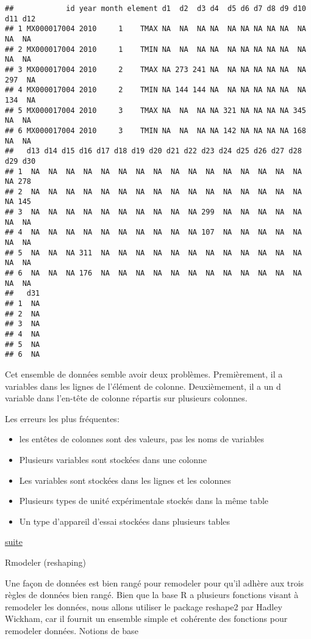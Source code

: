\documentclass[]{article}
\begin{document}
\begin{verbatim}
##            id year month element d1  d2  d3 d4  d5 d6 d7 d8 d9 d10 d11 d12
## 1 MX000017004 2010     1    TMAX NA  NA  NA NA  NA NA NA NA NA  NA  NA  NA
## 2 MX000017004 2010     1    TMIN NA  NA  NA NA  NA NA NA NA NA  NA  NA  NA
## 3 MX000017004 2010     2    TMAX NA 273 241 NA  NA NA NA NA NA  NA 297  NA
## 4 MX000017004 2010     2    TMIN NA 144 144 NA  NA NA NA NA NA  NA 134  NA
## 5 MX000017004 2010     3    TMAX NA  NA  NA NA 321 NA NA NA NA 345  NA  NA
## 6 MX000017004 2010     3    TMIN NA  NA  NA NA 142 NA NA NA NA 168  NA  NA
##   d13 d14 d15 d16 d17 d18 d19 d20 d21 d22 d23 d24 d25 d26 d27 d28 d29 d30
## 1  NA  NA  NA  NA  NA  NA  NA  NA  NA  NA  NA  NA  NA  NA  NA  NA  NA 278
## 2  NA  NA  NA  NA  NA  NA  NA  NA  NA  NA  NA  NA  NA  NA  NA  NA  NA 145
## 3  NA  NA  NA  NA  NA  NA  NA  NA  NA  NA 299  NA  NA  NA  NA  NA  NA  NA
## 4  NA  NA  NA  NA  NA  NA  NA  NA  NA  NA 107  NA  NA  NA  NA  NA  NA  NA
## 5  NA  NA  NA 311  NA  NA  NA  NA  NA  NA  NA  NA  NA  NA  NA  NA  NA  NA
## 6  NA  NA  NA 176  NA  NA  NA  NA  NA  NA  NA  NA  NA  NA  NA  NA  NA  NA
##   d31
## 1  NA
## 2  NA
## 3  NA
## 4  NA
## 5  NA
## 6  NA
\end{verbatim}

Cet ensemble de données semble avoir deux problèmes. Premièrement, il a
variables dans les lignes de l'élément de colonne. Deuxièmement, il a un
d variable dans l'en-tête de colonne répartis sur plusieurs colonnes.

Les erreurs les plus fréquentes:

\begin{itemize}
\itemsep1pt\parskip0pt
\item
  les entêtes de colonnes sont des valeurs, pas les noms de variables
\item
  Plusieurs variables sont stockées dans une colonne
\item
  Les variables sont stockées dans les lignes et les colonnes
\item
  Plusieurs types de unité expérimentale stockés dans la même table
\item
  Un type d'appareil d'essai stockées dans plusieurs tables
\end{itemize}

\href{https://ramnathv.github.io/pycon2014-r/explore/reshape.html}{suite}

Rmodeler (reshaping)

Une façon de données est bien rangé pour remodeler pour qu'il adhère aux
trois règles de données bien rangé. Bien que la base R a plusieurs
fonctions visant à remodeler les données, nous allons utiliser le
package reshape2 par Hadley Wickham, car il fournit un ensemble simple
et cohérente des fonctions pour remodeler données. Notions de base
\end{document}
